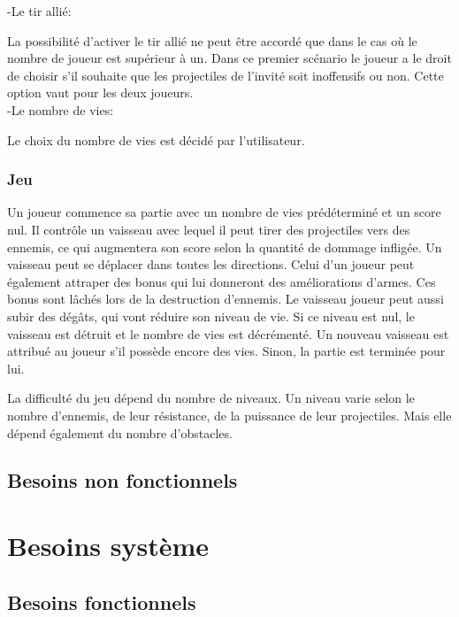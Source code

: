 \documentclass[a4paper,12pt]{article}
\begin{document}
-Le tir allié: 

La possibilité d'activer le tir allié ne peut être accordé que dans le cas où le nombre de joueur est supérieur à un.
Dans ce premier scénario le joueur a le droit de choisir s'il souhaite que les projectiles de l'invité soit inoffensifs ou non. Cette option vaut pour les deux joueurs. \\

-Le nombre de vies: 

Le choix du nombre de vies est décidé par l'utilisateur. \\

\subsubsection{Jeu}

Un joueur commence sa partie avec un nombre de vies prédéterminé et un score nul. 
Il contrôle un vaisseau avec lequel il peut tirer des projectiles vers des ennemis, ce qui augmentera son score selon la quantité de dommage infligée. Un vaisseau peut se déplacer dans toutes les directions. Celui d'un joueur peut également attraper des bonus qui lui donneront des améliorations d'armes. Ces bonus sont lâchés lors de la destruction d'ennemis. Le vaisseau joueur peut aussi subir des dégâts, qui vont réduire son niveau de vie. Si ce niveau est nul, le vaisseau est détruit et le nombre de vies est décrémenté. Un nouveau vaisseau est attribué au joueur s'il possède encore des vies. Sinon, la partie est terminée pour lui.

La difficulté du jeu dépend du nombre de niveaux. Un niveau varie selon le nombre d'ennemis, de leur résistance, de la puissance de leur projectiles. Mais elle dépend également du nombre d'obstacles.


\subsection{Besoins non fonctionnels}

\newpage

\section{Besoins système}
\subsection{Besoins fonctionnels}
\end{document}
